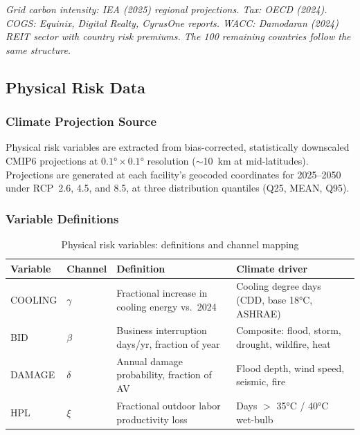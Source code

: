 \small\textit{Grid carbon intensity: IEA (2025) regional projections. Tax: OECD (2024).
COGS: Equinix, Digital Realty, CyrusOne reports. WACC: Damodaran (2024) REIT sector
with country risk premiums. The 100 remaining countries follow the same structure.}
\normalsize



\newpage
\subsection{Physical Risk Data}
\label{app:physical}

\subsubsection{Climate Projection Source}

Physical risk variables are extracted from bias-corrected, statistically downscaled CMIP6
projections \citep{eyring2016} at $0.1° \times 0.1°$ resolution ($\sim$10~km at
mid-latitudes). Projections are generated at each facility's geocoded coordinates for
2025--2050 under RCP~2.6, 4.5, and 8.5, at three distribution quantiles (Q25, MEAN, Q95).

\subsubsection{Variable Definitions}

\begin{table}[H]
\centering
\small
\caption{Physical risk variables: definitions and channel mapping}
\label{tab:app_physical_vars}
\begin{tabular}{@{}p{2.2cm}p{1.5cm}p{4cm}p{5.5cm}@{}}
\toprule
\textbf{Variable} & \textbf{Channel} & \textbf{Definition} & \textbf{Climate driver} \\
\midrule
COOLING & $\gamma$ & Fractional increase in cooling energy vs.\ 2024 & Cooling degree days (CDD, base 18°C, ASHRAE) \\
BID & $\beta$ & Business interruption days/yr, fraction of year & Composite: flood, storm, drought, wildfire, heat \\
DAMAGE & $\delta$ & Annual damage probability, fraction of AV & Flood depth, wind speed, seismic, fire \\
HPL & $\xi$ & Fractional outdoor labor productivity loss & Days $>$ 35°C / 40°C wet-bulb \\
\bottomrule
\end{tabular}
\end{table}


